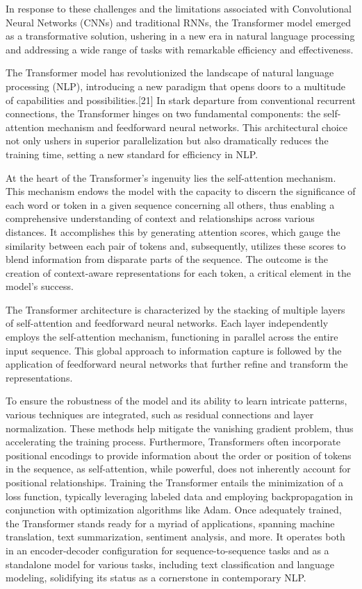 \documentclass[conference]{IEEEtran}
\begin{document}
In response to these challenges and the limitations associated with Convolutional Neural Networks (CNNs) and traditional RNNs, the Transformer model emerged as a transformative solution, ushering in a new era in natural language processing and addressing a wide range of tasks with remarkable efficiency and effectiveness.

The Transformer model has revolutionized the landscape of natural language processing (NLP), introducing a new paradigm that opens doors to a multitude of capabilities and possibilities.[21] In stark departure from conventional recurrent connections, the Transformer hinges on two fundamental components: the self-attention mechanism and feedforward neural networks. This architectural choice not only ushers in superior parallelization but also dramatically reduces the training time, setting a new standard for efficiency in NLP.


At the heart of the Transformer's ingenuity lies the self-attention mechanism. This mechanism endows the model with the capacity to discern the significance of each word or token in a given sequence concerning all others, thus enabling a comprehensive understanding of context and relationships across various distances. It accomplishes this by generating attention scores, which gauge the similarity between each pair of tokens and, subsequently, utilizes these scores to blend information from disparate parts of the sequence. The outcome is the creation of context-aware representations for each token, a critical element in the model's success.


The Transformer architecture is characterized by the stacking of multiple layers of self-attention and feedforward neural networks. Each layer independently employs the self-attention mechanism, functioning in parallel across the entire input sequence. This global approach to information capture is followed by the application of feedforward neural networks that further refine and transform the representations.


To ensure the robustness of the model and its ability to learn intricate patterns, various techniques are integrated, such as residual connections and layer normalization. These methods help mitigate the vanishing gradient problem, thus accelerating the training process. Furthermore, Transformers often incorporate positional encodings to provide information about the order or position of tokens in the sequence, as self-attention, while powerful, does not inherently account for positional relationships.
Training the Transformer entails the minimization of a loss function, typically leveraging labeled data and employing backpropagation in conjunction with optimization algorithms like Adam. Once adequately trained, the Transformer stands ready for a myriad of applications, spanning machine translation, text summarization, sentiment analysis, and more. It operates both in an encoder-decoder configuration for sequence-to-sequence tasks and as a standalone model for various tasks, including text classification and language modeling, solidifying its status as a cornerstone in contemporary NLP.
\end{document}
